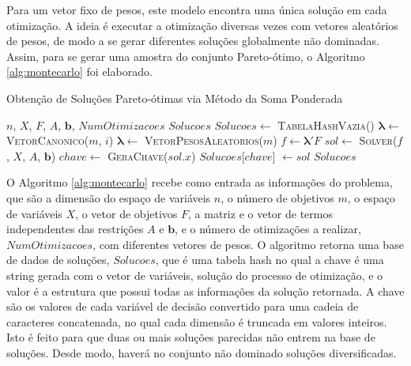 \documentclass [11pt]{articleSBPO}
\begin{document}
Para um vetor fixo de pesos, este modelo encontra uma única solução em cada otimização. A ideia é executar a otimização diversas vezes com vetores aleatórios de pesos, de modo a se gerar diferentes soluções globalmente não dominadas. Assim, para se gerar uma amostra do conjunto Pareto-ótimo, o Algoritmo \ref{alg:montecarlo} foi elaborado.

\begin{algorithm}
\caption{Obtenção de Soluções Pareto-ótimas via Método da Soma Ponderada}
\label{alg:montecarlo}
\begin{algorithmic}
	\REQUIRE $n$, $X$, $F$, $A$, $\mathbf{b}$, $NumOtimizacoes$
	\ENSURE $Solucoes$
	\STATE $Solucoes \leftarrow $ \textsc{TabelaHashVazia}()
    		\STATE $\boldsymbol{\lambda} \leftarrow$ \textsc{VetorCanonico}($m$, $i$)
    	\ELSE
	        \STATE $\boldsymbol{\lambda} \leftarrow$ \textsc{VetorPesosAleatorios}($m$)
    	\ENDIF
        \STATE $f \leftarrow \boldsymbol{\lambda}' F$
        \STATE $sol \leftarrow $ \textsc{Solver}($f$, $X$, $A$, $\mathbf{b}$)
        \STATE $ chave \leftarrow $ \textsc{GeraChave}($sol.x$)
            \STATE $Solucoes$[$chave$] $\leftarrow sol$
        \ENDIF
    \ENDFOR
    \RETURN $ Solucoes $
\end{algorithmic}
\end{algorithm}

O Algoritmo \ref{alg:montecarlo} recebe como entrada as informações do problema, que são a dimensão do espaço de variáveis $n$, o número de objetivos $m$, o espaço de variáveis $X$, o vetor de objetivos $F$, a matriz e o vetor de termos independentes das restrições $A$ e $\mathbf{b}$, e o número de otimizações a realizar, $NumOtimizacoes$, com diferentes vetores de pesos. O algoritmo retorna uma base de dados de soluções, $Solucoes$, que é uma tabela hash \cite{cormen2001introduction} no qual a chave é uma string gerada com o vetor de variáveis, solução do processo de otimização, e o valor é a estrutura que possui todas as informações da solução retornada. A chave são os valores de cada variável de decisão convertido para uma cadeia de caracteres concatenada, no qual cada dimensão é truncada em valores inteiros. Isto é feito para que duas ou mais soluções parecidas não entrem na base de soluções. Desde modo, haverá no conjunto não dominado soluções diversificadas.
\end{document}
